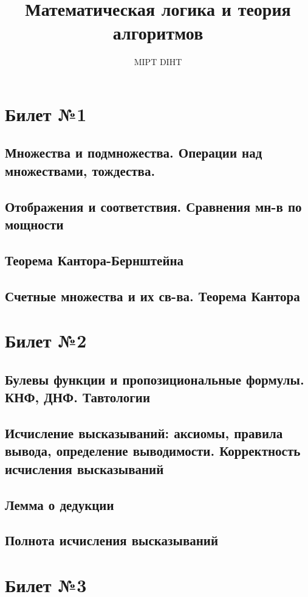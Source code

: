 \documentclass[a4paper]{article}
\title{Математическая логика и теория алгоритмов}
\author{MIPT DIHT}
\begin{document}
\maketitle

\section{Билет №1}
\subsection{Множества и подмножества. Операции над множествами, тождества.}
\subsection{Отображения и соответствия. Сравнения мн-в по мощности}
\subsection{Теорема Кантора-Бернштейна}
\subsection{Счетные множества и их св-ва. Теорема Кантора}

\section{Билет №2}
\subsection{Булевы функции и пропозициональные формулы. КНФ, ДНФ. Тавтологии}
\subsection{Исчисление высказываний: аксиомы, правила вывода, определение выводимости. Корректность исчисления высказываний}
\subsection{Лемма о дедукции}
\subsection{Полнота исчисления высказываний}

\section{Билет №3}
\end{document}
